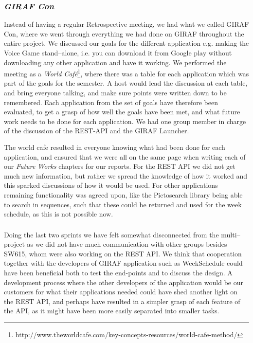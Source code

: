 \subsubsection*{\textit{GIRAF Con}}
Instead of having a regular Retrospective meeting, we had what we called GIRAF Con, where we went through everything we had done on GIRAF throughout the entire project.
We discussed our goals for the different application e.g. making the Voice Game stand--alone, i.e. you can download it from Google play without downloading any other application and have it working. 
We performed the meeting as a \textit{World Café}\footnote{http://www.theworldcafe.com/key-concepts-resources/world-cafe-method/}, where there was a table for each application which was part of the goals for the semester.
A host would lead the discussion at each table, and bring everyone talking, and make sure points were written down to be remembered.
Each application from the set of goals have therefore been evaluated, to get a grasp of how well the goals have been met, and what future work needs to be done for each application.
We had one group member in charge of the discussion of the REST-API and the GIRAF Launcher.

The world cafe resulted in everyone knowing what had been done for each application, and ensured that we were all on the same page when writing each of our \textit{Future Works} chapters for our reports. 
For the REST API we did not get much new information, but rather we spread the knowledge of how it worked and this sparked discussions of how it would be used.
For other applications remaining functionality was agreed upon, like the Pictosearch library being able to search in sequences, such that these could be returned and used for the week schedule, as this is not possible now.

\subsubsection*{}
Doing the last two sprints we have felt somewhat disconnected from the multi--project as we did not have much communication with other groups besides SW615, whom were also working on the REST API.
We think that cooperation together with the developers of GIRAF application such as WeekSchedule could have been beneficial both to test the end-points and to discuss the design.
A development process where the other developers of the application would be our customers for what their applications needed could have shed another light on the REST API, and perhaps have resulted in a simpler grasp of each feature of the API, as it might have been more easily separated into smaller tasks.


